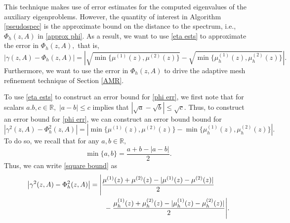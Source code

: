 This technique makes use of error estimates for the computed eigenvalues of the auxiliary eigenproblems. However, the quantity of interest in Algorithm \ref{pseudospec} is the approximate bound on the distance to the spectrum, i.e., $\Phi_h(z, A)$ in \eqref{approx phi}. As a result, we want to use \eqref{eta ests} to approximate the error in $\Phi_h(z, A),$ that is,
\begin{equation} \label{phi err}
    | \gamma(z, A) - \Phi_h(z, A)| = \left| \sqrt{ \min \{ \mu^{(1)}(z), \mu^{(2)}(z) \}}  - \sqrt{ \min \{ \mu_h^{(1)}(z), \mu_h^{(2)}(z) \}} \right|.
\end{equation}
Furthermore, we want to use the error in $\Phi_h(z, A)$ to drive the adaptive mesh refinement technique of Section \ref{AMR}.

To use \eqref{eta ests} to construct an error bound for \eqref{phi err}, we first note that for scalars $a. b, c \in \mathbb{R},$ $|a-b| \le c$ implies that $|\sqrt{a} - \sqrt{b}| \le \sqrt{c}.$ Thus, to construct an error bound for \eqref{phi err}, we can construct an error bound bound for
\begin{equation} \label{square bound}
    | \gamma^2(z, A) - \Phi_h^2(z, A)| = \left| \min \{ \mu^{(1)}(z), \mu^{(2)}(z)\}  - \min \{ \mu_h^{(1)}(z), \mu_h^{(2)}(z)\} \right|.
\end{equation}
To do so, we recall that for any $a, b \in \mathbb{R},$
 \begin{equation}
\min\{a, b\} = \frac{a + b - |a-b|}{2}.
\end{equation}
Thus, we can write \eqref{square bound} as
\begin{align}
    \left| \gamma^2(z,A) - \Phi_h^2(z,A) \right|
    &= \Bigg|
    \frac{\mu^{(1)}(z)+\mu^{(2)}(z)
    -|\mu^{(1)}(z)-\mu^{(2)}(z)|}{2} \notag\\
    &\qquad -
    \frac{\mu_h^{(1)}(z)+\mu_h^{(2)}(z)
    -|\mu_h^{(1)}(z)-\mu_h^{(2)}(z)|}{2}
    \Bigg|.
\end{align}
